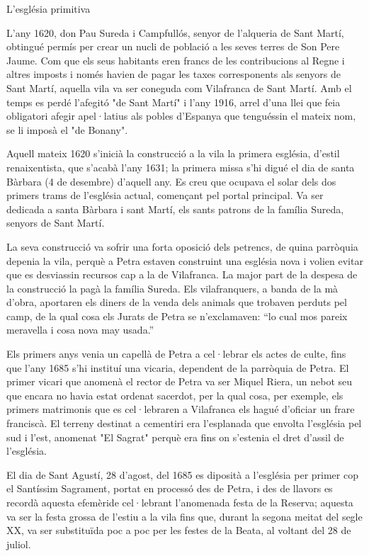 L'església primitiva

L'any 1620, don Pau Sureda i Campfullós, senyor de l'alqueria de Sant Martí, obtingué permís per crear un nucli de població a les seves terres de Son Pere Jaume. Com que els seus habitants eren francs de les contribucions al Regne i altres imposts i només havien de pagar les taxes corresponents als senyors de Sant Martí, aquella vila va ser coneguda com Vilafranca de Sant Martí. Amb el temps es perdé l'afegitó "de Sant Martí" i l'any 1916, arrel d'una llei que feia obligatori afegir apel·latius als pobles d'Espanya que tenguéssin el mateix nom, se li imposà el "de Bonany". 

Aquell mateix 1620 s'inicià la construcció a la vila la primera església, d'estil renaixentista, que s'acabà l'any 1631; la primera missa s'hi digué el dia de santa Bàrbara (4 de desembre) d'aquell any. Es creu que ocupava el solar dels dos primers trams de l'església actual, començant pel portal principal. Va ser dedicada a santa Bàrbara i sant Martí, els sants patrons de la família Sureda, senyors de Sant Martí.

La seva construcció va sofrir una forta oposició dels petrencs, de quina parròquia depenia la vila, perquè a Petra estaven construint una església nova i volien evitar que es desviassin recursos cap a la de Vilafranca. La major part de la despesa de la construcció la pagà la família Sureda. Els vilafranquers, a banda de la mà d'obra, aportaren els diners de la venda dels animals que trobaven perduts pel camp, de la qual cosa els Jurats de Petra se n'exclamaven: ``lo cual mos pareix meravella i cosa nova may usada.'' 

Els primers anys venia un capellà de Petra a cel·lebrar els actes de culte, fins que l'any 1685 s'hi instituí una vicaria, dependent de la parròquia de Petra. El primer vicari que anomenà el rector de Petra va ser Miquel Riera, un nebot seu que encara no havia estat ordenat sacerdot, per la qual cosa, per exemple, els primers matrimonis que es cel·lebraren a Vilafranca els hagué d'oficiar un frare franciscà. El terreny destinat a cementiri era l'esplanada que envolta l'església pel sud i l'est, anomenat "El Sagrat" perquè era fins on s'estenia el dret d'assil de l'església. 

El dia de Sant Agustí, 28 d'agost, del 1685 es diposità a l'església per primer cop el Santíssim Sagrament, portat en processó des de Petra, i des de llavors es recordà aquesta efemèride cel·lebrant l'anomenada festa de la Reserva; aquesta va ser la festa grossa de l'estiu a la vila fins que, durant la segona meitat del segle XX, va ser substituïda poc a poc per les festes de la Beata, al voltant del 28 de juliol. 


